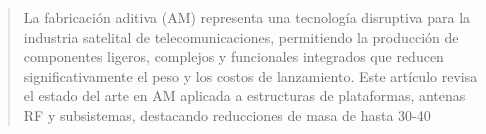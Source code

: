 \begin{abstract}
La fabricación aditiva (AM) representa una tecnología disruptiva para la industria satelital de telecomunicaciones, permitiendo la producción de componentes ligeros, complejos y funcionales integrados que reducen significativamente el peso y los costos de lanzamiento. Este artículo revisa el estado del arte en AM aplicada a estructuras de plataformas, antenas RF y subsistemas, destacando reducciones de masa de hasta 30-40%
\end{abstract}
